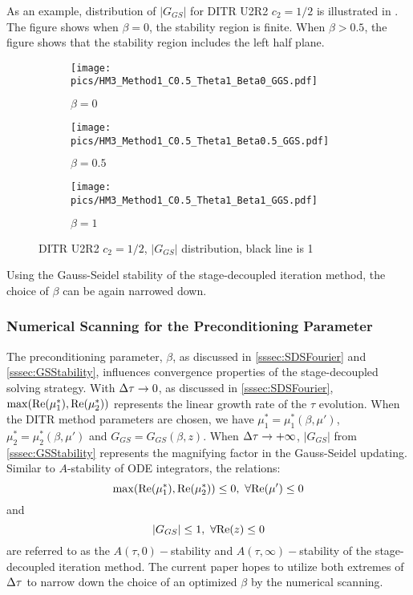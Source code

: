 As an example, distribution of $|G_{GS}|$ for DITR U2R2 $c_2=1/2$
is illustrated in .
The figure shows when $\beta=0$, the stability region is finite.
When $\beta>0.5$, the figure shows that the stability region includes
the left half plane.
\begin{figure}[htbp]
    \centering
    \begin{subfigure}{0.33\textwidth}
        \texttt{[image: pics/HM3\_Method1\_C0.5\_Theta1\_Beta0\_GGS.pdf]}
        \caption[]{$\beta = 0$}
    \end{subfigure}\hfill
    \begin{subfigure}{0.33\textwidth}
        \texttt{[image: pics/HM3\_Method1\_C0.5\_Theta1\_Beta0.5\_GGS.pdf]}
        \caption[]{$\beta = 0.5$}
    \end{subfigure}\hfill
    \begin{subfigure}{0.33\textwidth}
        \texttt{[image: pics/HM3\_Method1\_C0.5\_Theta1\_Beta1\_GGS.pdf]}
        \caption[]{$\beta = 1$}
    \end{subfigure}
    \caption{DITR U2R2 $c_2=1/2$, $|G_{GS}|$ distribution, black line is 1}
    \label{fig:GGSU2R2}
\end{figure}

Using the Gauss-Seidel stability of the stage-decoupled iteration method,
the choice of $\beta$ can be again narrowed down.

\subsubsection{Numerical Scanning for the Preconditioning Parameter}
\label{sssec:numScan}

The preconditioning parameter, $\beta$, as discussed in \ref{sssec:SDSFourier}
and \ref{sssec:GSStability}, influences convergence properties of the
stage-decoupled solving strategy.
With ${\Delta} \tau\rightarrow0$, as discussed in \ref{sssec:SDSFourier},
$\max(\mathrm{Re}(\mu^*_1),\mathrm{Re}(\mu^*_2))$ represents the linear growth
rate of the $\tau$ evolution.
When the DITR method parameters are chosen, we have
$\mu^*_1=\mu^*_1(\beta, \mu')$, $\mu^*_2=\mu^*_2(\beta, \mu')$ and $G_{GS}=G_{GS}(\beta, z)$.
When ${\Delta} \tau\rightarrow+\infty$, $|G_{GS}|$ from \ref{sssec:GSStability}
represents the magnifying factor in the Gauss-Seidel updating.
Similar to $A$-stability of ODE integrators,
the relations:
\begin{equation}
    \max(\real(\mu^*_1),\real(\mu^*_2)) \leq 0,\ \forall \real(\mu') \leq 0
\end{equation}
and
\begin{equation}
    |G_{GS}| \leq 1,\ \forall \mathrm{Re}(z) \leq 0
\end{equation}
are referred to as the $A(\tau,0)-$stability and
$A(\tau,\infty)-$stability
of the stage-decoupled iteration method.
The current paper hopes to utilize both extremes of ${\Delta}\tau$ to
narrow down the choice of an optimized $\beta$ by the numerical scanning.


